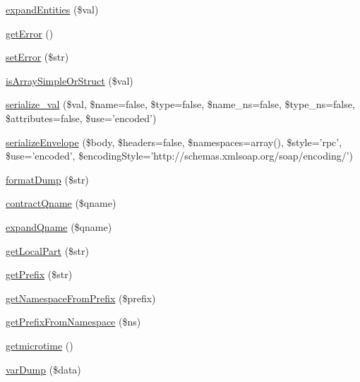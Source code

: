 \begin{DoxyCompactItemize}
\item 
\hyperlink{classnusoap__base_ad9e06c7fc6850aa47459bab8f5593520}{expand\-Entities} (\$val)
\item 
\hyperlink{classnusoap__base_a24ada5decce3d1b79cd82f5a90ccf404}{get\-Error} ()
\item 
\hyperlink{classnusoap__base_a89a9fdd49ee8436ae44af84f18177bcf}{set\-Error} (\$str)
\item 
\hyperlink{classnusoap__base_a3f7c5ca19c4afead9923f60efc66b9de}{is\-Array\-Simple\-Or\-Struct} (\$val)
\item 
\hyperlink{classnusoap__base_a22f911ea3c09627dd423ded892862033}{serialize\-\_\-val} (\$val, \$name=false, \$type=false, \$name\-\_\-ns=false, \$type\-\_\-ns=false, \$attributes=false, \$use='encoded')
\item 
\hyperlink{classnusoap__base_a8b06d8e53a3ca64b0d28d76dbdbd1cb3}{serialize\-Envelope} (\$body, \$headers=false, \$namespaces=array(), \$style='rpc', \$use='encoded', \$encoding\-Style='http\-://schemas.\-xmlsoap.\-org/soap/encoding/')
\item 
\hyperlink{classnusoap__base_a25b092fe846b5b64eb91f3e69c0135d7}{format\-Dump} (\$str)
\item 
\hyperlink{classnusoap__base_a80d8fbb13c77aa2c9f55412d3ec42b35}{contract\-Qname} (\$qname)
\item 
\hyperlink{classnusoap__base_a4ae2088629a518bce1dcd587493ba1c5}{expand\-Qname} (\$qname)
\item 
\hyperlink{classnusoap__base_ad8a635f36c991a56a1f922bbb4f4b926}{get\-Local\-Part} (\$str)
\item 
\hyperlink{classnusoap__base_a4065364adef252b0f97ae746c4ad04bf}{get\-Prefix} (\$str)
\item 
\hyperlink{classnusoap__base_ac1674cfdd84b7c057f567b5a412765ca}{get\-Namespace\-From\-Prefix} (\$prefix)
\item 
\hyperlink{classnusoap__base_ac61943e23235475161427270581a0b32}{get\-Prefix\-From\-Namespace} (\$ns)
\item 
\hyperlink{classnusoap__base_acdd881f58961544f44bfe96ad57f1299}{getmicrotime} ()
\item 
\hyperlink{classnusoap__base_a072b06434688ac7c909f822ddbb48535}{var\-Dump} (\$data)
\end{DoxyCompactItemize}
